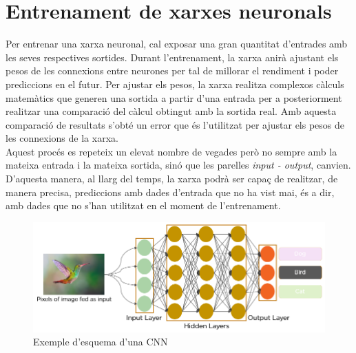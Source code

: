\documentclass[a4paper,12pt]{report}
\begin{document}
\section*{Entrenament de xarxes neuronals}
Per entrenar una xarxa neuronal, cal exposar una gran quantitat d'entrades amb les seves respectives sortides. Durant l'entrenament, la xarxa anirà ajustant els pesos de les connexions entre neurones per tal de millorar el rendiment i poder prediccions en el futur. Per ajustar els pesos, la xarxa realitza complexos càlculs matemàtics que generen una sortida a partir d'una entrada per a posteriorment realitzar una comparació del càlcul obtingut amb la sortida real. Amb aquesta comparació de resultats s'obté un error que és l'utilitzat per ajustar els pesos de les connexions de la xarxa.\\
Aquest procés es repeteix un elevat nombre de vegades però no sempre amb la mateixa entrada i la mateixa sortida, sinó que les parelles \textit{input - output}, canvien. D'aquesta manera, al llarg del temps, la xarxa podrà ser capaç de realitzar, de manera precisa, prediccions amb dades d'entrada que no ha vist mai, és a dir, amb dades que no s'han utilitzat en el moment de l'entrenament.
\begin{figure}[H]
    \centering
    \includegraphics[scale = 0.5]{images/CNN.png}
    \caption{Exemple d'esquema d'una CNN}
    \label{fig:cnn}
\end{figure}
\end{document}
